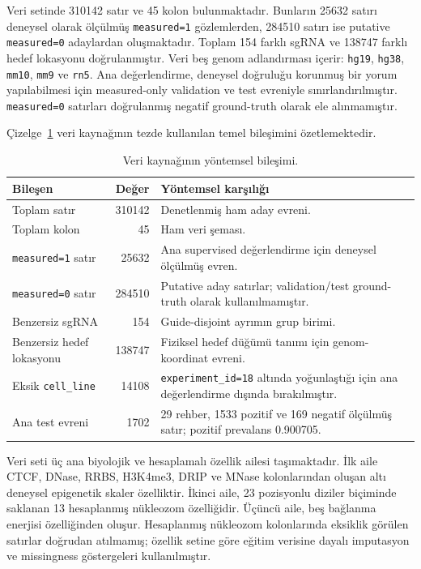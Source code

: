 Veri setinde 310142 satır ve 45 kolon bulunmaktadır. Bunların 25632 satırı deneysel olarak ölçülmüş \texttt{measured=1} gözlemlerden, 284510 satırı ise putative \texttt{measured=0} adaylardan oluşmaktadır. Toplam 154 farklı sgRNA ve 138747 farklı hedef lokasyonu doğrulanmıştır. Veri beş genom adlandırması içerir: \texttt{hg19}, \texttt{hg38}, \texttt{mm10}, \texttt{mm9} ve \texttt{rn5}. Ana değerlendirme, deneysel doğruluğu korunmuş bir yorum yapılabilmesi için measured-only validation ve test evreniyle sınırlandırılmıştır. \texttt{measured=0} satırları doğrulanmış negatif ground-truth olarak ele alınmamıştır.

Çizelge~\ref{tab:veri-evreni} veri kaynağının tezde kullanılan temel bileşimini özetlemektedir.

\begin{table}[htbp]
\caption{Veri kaynağının yöntemsel bileşimi.}
\label{tab:veri-evreni}
\centering
\small
\begin{tabularx}{\textwidth}{l r X}
\toprule\toprule
Bileşen & Değer & Yöntemsel karşılığı\\
\midrule
Toplam satır & 310142 & Denetlenmiş ham aday evreni.\\
Toplam kolon & 45 & Ham veri şeması.\\
\texttt{measured=1} satır & 25632 & Ana supervised değerlendirme için deneysel ölçülmüş evren.\\
\texttt{measured=0} satır & 284510 & Putative aday satırlar; validation/test ground-truth olarak kullanılmamıştır.\\
Benzersiz sgRNA & 154 & Guide-disjoint ayrımın grup birimi.\\
Benzersiz hedef lokasyonu & 138747 & Fiziksel hedef düğümü tanımı için genom-koordinat evreni.\\
Eksik \texttt{cell\_line} & 14108 & \texttt{experiment\_id=18} altında yoğunlaştığı için ana değerlendirme dışında bırakılmıştır.\\
Ana test evreni & 1702 & 29 rehber, 1533 pozitif ve 169 negatif ölçülmüş satır; pozitif prevalans 0.900705.\\
\bottomrule
\end{tabularx}
\end{table}

Veri seti üç ana biyolojik ve hesaplamalı özellik ailesi taşımaktadır. İlk aile CTCF, DNase, RRBS, H3K4me3, DRIP ve MNase kolonlarından oluşan altı deneysel epigenetik skaler özelliktir. İkinci aile, 23 pozisyonlu diziler biçiminde saklanan 13 hesaplanmış nükleozom özelliğidir. Üçüncü aile, beş bağlanma enerjisi özelliğinden oluşur. Hesaplanmış nükleozom kolonlarında eksiklik görülen satırlar doğrudan atılmamış; özellik setine göre eğitim verisine dayalı imputasyon ve missingness göstergeleri kullanılmıştır.

